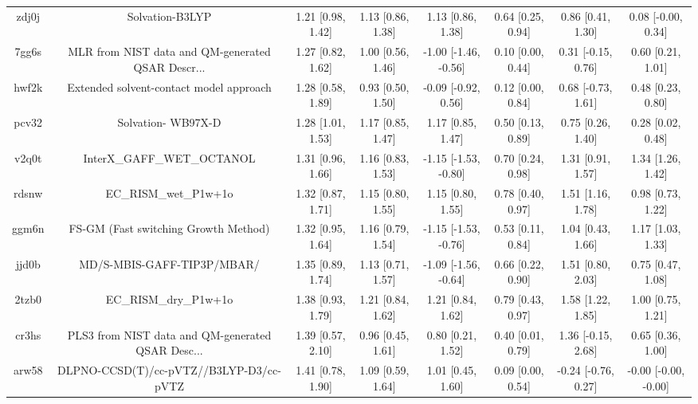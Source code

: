 \documentclass{article}
\begin{document}
\begin{center}
\begin{longtable}{|cccccccc|}
 zdj0j &                                    Solvation-B3LYP &  1.21 [0.98, 1.42] &  1.13 [0.86, 1.38] &     1.13 [0.86, 1.38] &  0.64 [0.25, 0.94] &    0.86 [0.41, 1.30] &    0.08 [-0.00, 0.34] \\
 7gg6s &  MLR from NIST data and QM-generated QSAR Descr... &  1.27 [0.82, 1.62] &  1.00 [0.56, 1.46] &  -1.00 [-1.46, -0.56] &  0.10 [0.00, 0.44] &   0.31 [-0.15, 0.76] &     0.60 [0.21, 1.01] \\
 hwf2k &            Extended solvent-contact model approach &  1.28 [0.58, 1.89] &  0.93 [0.50, 1.50] &   -0.09 [-0.92, 0.56] &  0.12 [0.00, 0.84] &   0.68 [-0.73, 1.61] &     0.48 [0.23, 0.80] \\
 pcv32 &                                 Solvation- WB97X-D &  1.28 [1.01, 1.53] &  1.17 [0.85, 1.47] &     1.17 [0.85, 1.47] &  0.50 [0.13, 0.89] &    0.75 [0.26, 1.40] &     0.28 [0.02, 0.48] \\
 v2q0t &                         InterX\_GAFF\_WET\_OCTANOL &  1.31 [0.96, 1.66] &  1.16 [0.83, 1.53] &  -1.15 [-1.53, -0.80] &  0.70 [0.24, 0.98] &    1.31 [0.91, 1.57] &     1.34 [1.26, 1.42] \\
 rdsnw &                              EC\_RISM\_wet\_P1w+1o &  1.32 [0.87, 1.71] &  1.15 [0.80, 1.55] &     1.15 [0.80, 1.55] &  0.78 [0.40, 0.97] &    1.51 [1.16, 1.78] &     0.98 [0.73, 1.22] \\
 ggm6n &               FS-GM (Fast switching Growth Method) &  1.32 [0.95, 1.64] &  1.16 [0.79, 1.54] &  -1.15 [-1.53, -0.76] &  0.53 [0.11, 0.84] &    1.04 [0.43, 1.66] &     1.17 [1.03, 1.33] \\
 jjd0b &                         MD/S-MBIS-GAFF-TIP3P/MBAR/ &  1.35 [0.89, 1.74] &  1.13 [0.71, 1.57] &  -1.09 [-1.56, -0.64] &  0.66 [0.22, 0.90] &    1.51 [0.80, 2.03] &     0.75 [0.47, 1.08] \\
 2tzb0 &                              EC\_RISM\_dry\_P1w+1o &  1.38 [0.93, 1.79] &  1.21 [0.84, 1.62] &     1.21 [0.84, 1.62] &  0.79 [0.43, 0.97] &    1.58 [1.22, 1.85] &     1.00 [0.75, 1.21] \\
 cr3hs &  PLS3 from NIST data and QM-generated QSAR Desc... &  1.39 [0.57, 2.10] &  0.96 [0.45, 1.61] &     0.80 [0.21, 1.52] &  0.40 [0.01, 0.79] &   1.36 [-0.15, 2.68] &     0.65 [0.36, 1.00] \\
 arw58 &            DLPNO-CCSD(T)/cc-pVTZ//B3LYP-D3/cc-pVTZ &  1.41 [0.78, 1.90] &  1.09 [0.59, 1.64] &     1.01 [0.45, 1.60] &  0.09 [0.00, 0.54] &  -0.24 [-0.76, 0.27] &  -0.00 [-0.00, -0.00] \\

\end{longtable}
\end{center}
\end{document}
